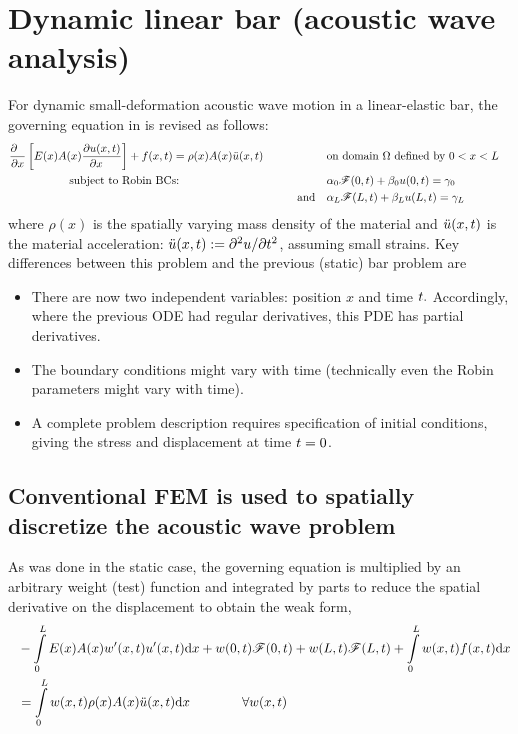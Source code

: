\section{Dynamic linear bar (acoustic wave analysis)}

For dynamic small-deformation acoustic wave motion in a linear-elastic bar, the governing equation in  is revised as follows:
\begin{equation}
\begin{aligned}
  &\frac{\partial~~}{\partial x}\left[E(x)A(x) \frac{\partial u(x,{t})}{\partial x~~~}\right]+f(x,{t})=\rho(x)A(x)\ddot{u}(x,{t}) \qquad  &          &\text{on domain $\Omega$ defined by }0<x<L& \\
  &\text{~~~~~~~~~~~~~~~~subject to Robin BCs: }
       &&\alpha_0 \mathscr{F}(0,{t})+\beta_0 u(0,{t})=\gamma_0 \\
       &&\text{and ~~}&\alpha_L \mathscr{F}(L,{t})+\beta_L u(L,{t})=\gamma_L 
\end{aligned}
\label{eq:LinearBarStrongFormAcoustic}
\end{equation}
where $\rho(x)$ is the spatially varying mass density of the material and $\ddot{u}(x,{t})$ is the material acceleration: $\ddot{u}(x,{t}):=\partial^2 u/\partial {\ensuremath{t}}^2$, assuming small strains. Key differences between this problem and the previous (static) bar problem are 
\begin{itemize}
  \item There are now two independent variables: position $x$ and time ${t}.$ Accordingly, where the previous ODE had regular derivatives, this PDE has partial derivatives.
  \item The boundary conditions might vary with time (technically even the Robin parameters might vary with time).
  \item A complete problem description requires specification of initial conditions, giving the stress and displacement at time ${t}=0$.
\end{itemize}
\subsection{Conventional FEM is used to spatially discretize the acoustic wave problem}
As was done in the static case, the governing equation is multiplied by an arbitrary weight (test) function and integrated by parts to reduce the spatial derivative on the displacement to obtain the weak form,
\begin{equation}
\begin{aligned}
 ~~&-\int\limits_0^L E(x)A(x) w'(x,{t})u'(x,{t})\mathrm{d} x 
+ w(0,{t})\mathscr{F}(0,{t})+w(L,{t})\mathscr{F}(L,{t}) 
+ \int\limits_0^L w(x,{t})f(x,{t})\mathrm{d} x\\
&= \int\limits_0^L w(x,{t})\rho(x)A(x)\ddot{u}(x,{t})\mathrm{d} x
\qquad\qquad\forall w(x,{t})
\end{aligned}
\label{eq:LinearBarWeakFormWithForcesTransient}
\end{equation}

